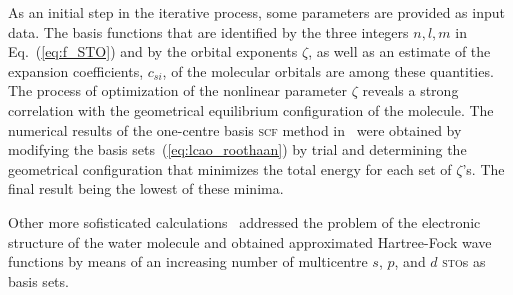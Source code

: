  
As an initial step in the iterative process, some parameters are
provided as input data. The basis functions that are identified by the
three integers $n,l,m$ in Eq.~(\ref{eq:f_STO}) and by the orbital
exponents $\zeta$, as well as an estimate of the expansion
coefficients, $c_{si}$, of the molecular orbitals are among these
quantities. The process of optimization of the nonlinear parameter
$\zeta$ reveals a strong correlation with the geometrical equilibrium
configuration of the molecule. The numerical results of the one-centre
basis \textsc{scf} method
in~\cite{Moccia_JCP_2164,Moccia_JCP_2176,Moccia_1964} were obtained by
modifying the basis sets~(\ref{eq:lcao_roothaan}) by trial and
determining the geometrical configuration that minimizes the total
energy for each set of $\zeta$'s. The final result being the lowest of
these minima.








Other more sofisticated calculations~\cite{Pitzer_1968,Pitzer_1970}
addressed the problem of the electronic structure of the water
molecule and obtained approximated Hartree-Fock wave functions by
means of an increasing number of multicentre $s$, $p$, and $d$
\textsc{sto}s as basis sets.




